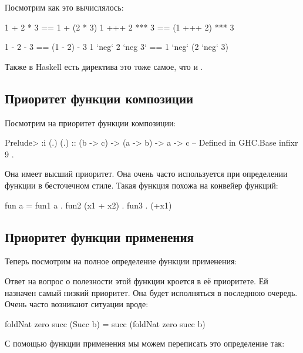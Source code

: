 Посмотрим как это вычислялось:

\begin{code}
1   +   2   *  3  ==   1   +   (2    *   3)
1  +++  2  *** 3  ==  (1  +++   2)  ***  3

1   -   2   -  3  ==  (1   -    2)   -   3
1 `neg` 2 `neg 3` ==   1 `neg` (2  `neg` 3)
\end{code}

Также в Haskell есть директива  это тоже самое, что и
.


\subsection{Приоритет функции композиции}

Посмотрим на приоритет функции композиции:

\begin{code}
Prelude> :i (.)
(.) :: (b -> c) -> (a -> b) -> a -> c 	-- Defined in GHC.Base
infixr 9 .
\end{code}

Она имеет высший приоритет. Она очень часто используется
при определении функции в бесточечном стиле. Такая функция 
похожа на конвейер функций:

\begin{code}
fun a = fun1 a . fun2 (x1 + x2) . fun3 . (+x1) 
\end{code}


\subsection{Приоритет функции применения}

Теперь посмотрим на полное определение функции применения:


Ответ на вопрос о полезности этой функции кроется в её приоритете. Ей
назначен самый низкий приоритет. Она будет исполняться в последнюю
очередь. Очень часто возникают ситуации вроде:

\begin{code}
foldNat zero succ (Succ b) = succ (foldNat zero succ b)
\end{code}

С помощью функции применения мы можем переписать это
определение так:

